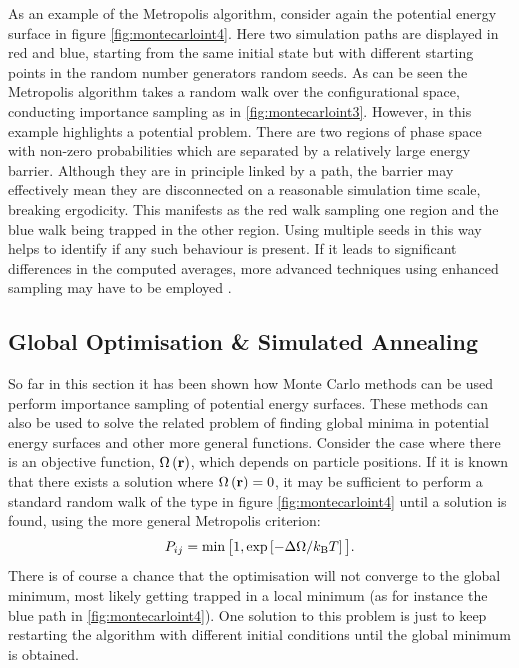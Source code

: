 As an example of the Metropolis algorithm, consider again the \td{} potential energy surface in figure \ref{fig:montecarloint4}.
Here two simulation paths are displayed in red and blue, starting from the same initial state but with different starting points in the random number generators \ie{} random seeds.
As can be seen the Metropolis algorithm takes a random walk over the configurational space, conducting importance sampling as in \ref{fig:montecarloint3}.
However, in this example highlights a potential problem.
There are two regions of phase space with non\--zero probabilities which are separated by a relatively large energy barrier.
Although they are in principle linked by a path, the barrier may effectively mean they are disconnected on a reasonable simulation time scale, breaking ergodicity.
This manifests as the red walk sampling one region and the blue walk being trapped in the other region.
Using multiple seeds in this way helps to identify if any such behaviour is present.
If it leads to significant differences in the computed averages, more advanced techniques using enhanced sampling may have to be employed \cite{Torrie1977,Earl2005}.

\subsection{Global Optimisation \& Simulated Annealing}
\label{ssec:simulatedannealing}

So far in this section it has been shown how Monte Carlo methods can be used perform importance sampling of potential energy surfaces.
These methods can also be used to solve the related problem of finding global minima in potential energy surfaces and other more general functions.
Consider the case where there is an objective function, $\Omega\left(\mathbf{r}\right)$, which depends on particle positions.
If it is known that there exists a solution where $\Omega\left(\mathbf{r}\right)=0$, it may be sufficient to perform a standard random walk of the type in figure \ref{fig:montecarloint4} until a solution is found, using the more general Metropolis criterion:
\begin{equation}
	\label{eq:objmetropolis}
	P_{ij} = \min\big[1,\exp\left[-\Delta\Omega/k_\text{B} T\right]\big].
\end{equation}
There is of course a chance that the optimisation will not converge to the global minimum, most likely getting trapped in a local minimum (as for instance the blue path in \ref{fig:montecarloint4}).
One solution to this problem is just to keep restarting the algorithm with different initial conditions until the global minimum is obtained.

